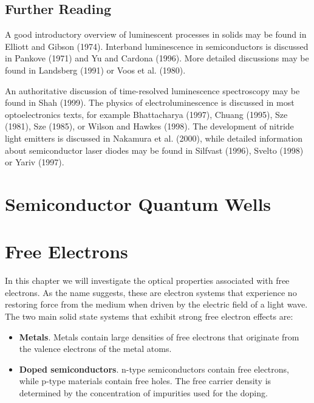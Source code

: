 \documentclass[12pt]{book}
\begin{document}
{\section*{Further Reading}
A good introductory overview of luminescent processes in solids may be found in Elliott and Gibson (1974). Interband luminescence in semiconductors is discussed in Pankove (1971) and Yu and Cardona (1996). More detailed discussions may be found in Landsberg (1991) or Voos et al. (1980).

An authoritative discussion of time-resolved luminescence spectroscopy may be found in Shah (1999).
The physics of electroluminescence is discussed in most optoelectronics texts, for example Bhattacharya (1997), Chuang (1995), Sze (1981), Sze (1985), or Wilson and Hawkes (1998). The development of nitride light emitters is discussed in Nakamura et al. (2000), while detailed information about semiconductor laser diodes may be found in Silfvast (1996), Svelto (1998) or Yariv (1997).

\chapter{Semiconductor Quantum Wells}\label{chap:6}
\chapter{Free Electrons}\label{chap:7}

\begin{shaded}
In this chapter we will investigate the optical properties associated with free electrons. As the name suggests, these are electron systems that experience no restoring force from the medium when driven by the electric field of a light wave. The two main solid state systems that exhibit strong free electron effects are:
\begin{itemize}
  \item \textbf{Metals}. Metals contain large densities of free electrons that originate from the valence electrons of the metal atoms.
  \item \textbf{Doped semiconductors}. n-type semiconductors contain free electrons, while p-type materials contain free holes. The free carrier density is determined by the concentration of impurities used for the doping.
\end{itemize}


\end{shaded}}
\end{document}

